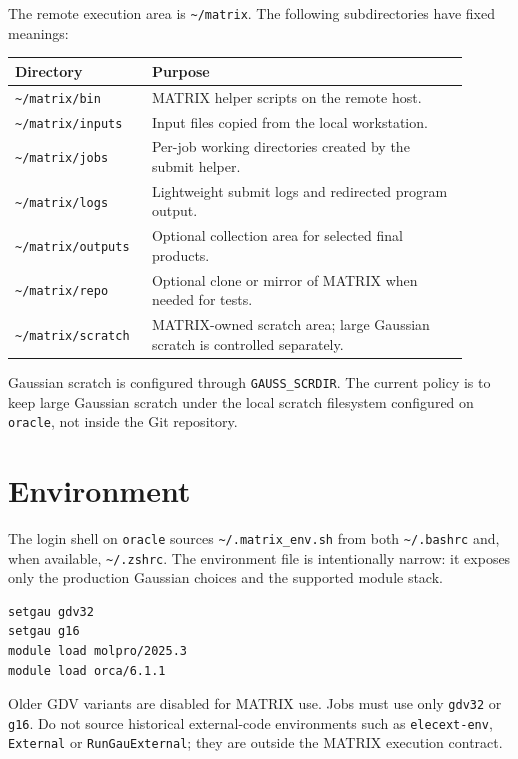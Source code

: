 \documentclass[11pt]{article}
\newcommand{\host}{\texttt{oracle}}
\begin{document}
The remote execution area is \texttt{\textasciitilde/matrix}.  The following
subdirectories have fixed meanings:

\begin{longtable}{
  >{\raggedright\arraybackslash}p{0.25\linewidth}
  >{\raggedright\arraybackslash}p{0.65\linewidth}}
\toprule
Directory & Purpose \\
\midrule
\texttt{\textasciitilde/matrix/bin} & MATRIX helper scripts on the remote host. \\
\texttt{\textasciitilde/matrix/inputs} & Input files copied from the local workstation. \\
\texttt{\textasciitilde/matrix/jobs} & Per-job working directories created by the submit helper. \\
\texttt{\textasciitilde/matrix/logs} & Lightweight submit logs and redirected program output. \\
\texttt{\textasciitilde/matrix/outputs} & Optional collection area for selected final products. \\
\texttt{\textasciitilde/matrix/repo} & Optional clone or mirror of MATRIX when needed for tests. \\
\texttt{\textasciitilde/matrix/scratch} & MATRIX-owned scratch area; large Gaussian scratch is controlled separately. \\
\bottomrule
\end{longtable}

Gaussian scratch is configured through \texttt{GAUSS\_SCRDIR}.  The current
policy is to keep large Gaussian scratch under the local scratch filesystem
configured on \host{}, not inside the Git repository.

\section{Environment}

The login shell on \host{} sources \texttt{\textasciitilde/.matrix\_env.sh}
from both \texttt{\textasciitilde/.bashrc} and, when available,
\texttt{\textasciitilde/.zshrc}.  The environment file is intentionally narrow:
it exposes only the production Gaussian choices and the supported module stack.

\begin{lstlisting}[style=matrix]
setgau gdv32
setgau g16
module load molpro/2025.3
module load orca/6.1.1
\end{lstlisting}

Older GDV variants are disabled for MATRIX use.  Jobs must use only
\texttt{gdv32} or \texttt{g16}.  Do not source historical external-code
environments such as \texttt{elecext-env}, \texttt{External} or
\texttt{RunGauExternal}; they are outside the MATRIX execution contract.
\end{document}
